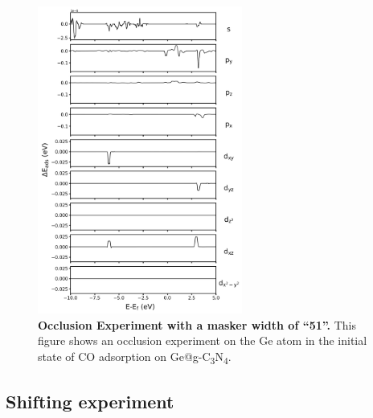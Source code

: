 \begin{figure}[htbp]
  \centering
  \includegraphics[width=0.6\textwidth]{supp_fig29_occl_wid51.png}
  \caption{\textbf{Occlusion Experiment with a masker width of ``51''.}
  This figure shows an occlusion experiment on the Ge atom in
  the initial state of CO adsorption on Ge@g-C\textsubscript{3}N\textsubscript{4}.}
  \label{supp_fig29:occl_wid51}
\end{figure}

\subsection{Shifting experiment}
\label{supp_sec3.6_shifting}

